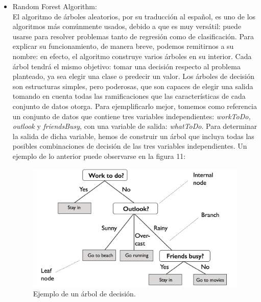 \documentclass[spanish,12pt,letterpaper]{article}
\begin{document}
\begin{itemize}
    \item Random Forest Algorithm:\\
    El algoritmo de árboles aleatorios, por su traducción al español, es uno de los algoritmos más comúnmente usados, debido a que es muy versátil: puede usarse para resolver problemas tanto de regresión como de clasificación. Para explicar su funcionamiento, de manera breve, podemos remitirnos a su nombre: en efecto, el algoritmo construye varios árboles en su interior. Cada árbol tendrá el mismo objetivo: tomar una decisión respecto al problema planteado, ya sea elegir una clase o predecir un valor. Los árboles de decisión son estructuras simples, pero poderosas, que son capaces de elegir una salida tomando en cuenta todas las ramificaciones que las características de cada conjunto de datos otorga. Para ejemplificarlo mejor, tomemos como referencia un conjunto de datos que contiene tres variables independientes: \textit{workToDo, outlook} y \textit{friendsBusy}, con una variable de salida: \textit{whatToDo}. Para determinar la salida de dicha variable, hemos de construir un árbol que incluya todas las posibles combinaciones de decisión de las tres variables independientes. Un ejemplo de lo anterior puede observarse en la figura 11:
    \begin{figure}[H]
        \centering
        \includegraphics[width=1\columnwidth]{Decision_Tree_Example.jpg}
        \caption{Ejemplo de un árbol de decisión.}
        \label{fig:comand}%
    \end{figure}
    

\end{itemize}
\end{document}
